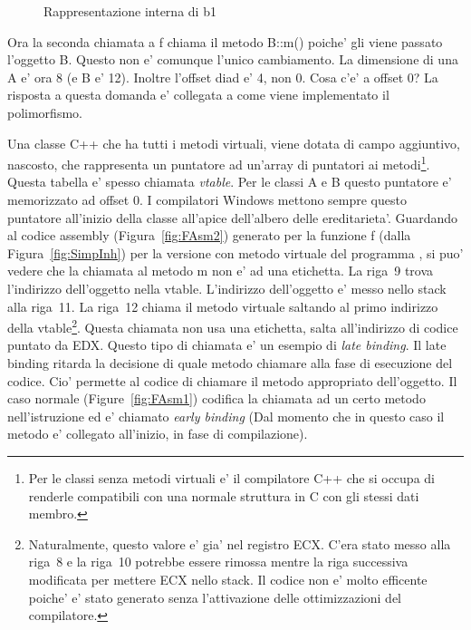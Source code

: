 \begin{figure}[tp]
\centering

\caption{Rappresentazione interna di {\code b1}\label{fig:vtable}}
\end{figure}

Ora la seconda chiamata a {\code f} chiama il metodo {\code B::m()} poiche'
gli viene passato l'oggetto {\code B}. Questo non e' comunque l'unico
cambiamento. La dimensione di una {\code A} e' ora 8 (e {\code B} e' 12).
Inoltre l'offset di{\code ad} e' 4, non 0. Cosa c'e' a offset 0? La risposta 
a questa domanda e' collegata a come viene implementato il polimorfismo.

 Una classe C++ che ha tutti i metodi virtuali, viene
dotata di campo aggiuntivo, nascosto, che rappresenta un puntatore ad
un'array di puntatori ai metodi\footnote{Per le classi senza metodi
virtuali e' il compilatore C++ che si occupa di renderle compatibili
con una normale struttura in C con gli stessi dati membro.}. Questa
tabella e' spesso chiamata \emph{vtable}. Per le classi {\code A} e
{\code B} questo puntatore e' memorizzato ad offset 0. I compilatori
Windows mettono sempre questo puntatore all'inizio della classe 
all'apice dell'albero delle ereditarieta'. Guardando al codice assembly
(Figura~\ref{fig:FAsm2}) generato per la funzione {\code f} (dalla
Figura~\ref{fig:SimpInh}) per la versione con metodo virtuale del
programma , si puo' vedere che la chiamata al metodo {\code m} non
e' ad una etichetta. La riga~9 trova l'indirizzo dell'oggetto nella
vtable. L'indirizzo dell'oggetto e' messo nello stack alla riga~11.
La riga~12 chiama il metodo virtuale saltando al primo indirizzo della
vtable\footnote{Naturalmente, questo valore e' gia' nel registro {\code ECX}.
C'era stato messo alla riga~8 e la riga~10 potrebbe essere rimossa mentre
la riga successiva modificata per mettere {\code ECX} nello stack. Il codice
non e' molto efficente poiche' e' stato generato senza l'attivazione
delle ottimizzazioni del compilatore.}. Questa chiamata non usa una 
etichetta, salta all'indirizzo di codice puntato da {\code EDX}. Questo
tipo di chiamata e' un esempio di \emph{late binding}.
Il late binding ritarda la decisione di quale metodo chiamare alla fase
di esecuzione del codice. Cio' permette al codice di chiamare il metodo
appropriato dell'oggetto. Il caso normale (Figure~\ref{fig:FAsm1}) codifica
la chiamata ad un certo metodo nell'istruzione ed e' chiamato \emph{early binding}
(Dal momento che in questo caso il metodo e' collegato all'inizio,
in fase di compilazione).

